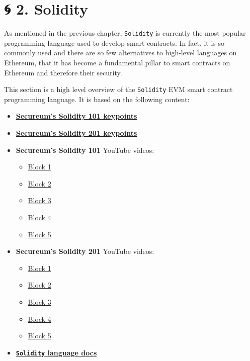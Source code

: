 \chapter{🌀 2. Solidity}\label{solidity}

As mentioned in the previous chapter, \texttt{Solidity} is currently the
most popular programming language used to develop smart contracts. In
fact, it is so commonly used and there are so few alternatives to
high-level languages on Ethereum, that it has become a fundamental
pillar to smart contracts on Ethereum and therefore their security.

This section is a high level overview of the \texttt{Solidity} EVM smart
contract programming language. It is based on the following content:

\begin{itemize}
\tightlist
\item
  \href{https://secureum.substack.com/p/solidity-101}{\textbf{Secureum's
  Solidity 101 keypoints}}
\item
  \href{https://secureum.substack.com/p/solidity-201}{\textbf{Secureum's
  Solidity 201 keypoints}}
\item
  \textbf{Secureum's Solidity 101} YouTube videos:

  \begin{itemize}
  \tightlist
  \item
    \href{https://www.youtube.com/watch?v=5eLqFac5Tkg}{Block 1}
  \item
    \href{https://www.youtube.com/watch?v=TCl1IcGl_3I}{Block 2}
  \item
    \href{https://www.youtube.com/watch?v=6VIJpze1jbU}{Block 3}
  \item
    \href{https://www.youtube.com/watch?v=WgU7KKKomMk}{Block 4}
  \item
    \href{https://www.youtube.com/watch?v=_oN7XuyhoZA}{Block 5}
  \end{itemize}
\item
  \textbf{Secureum's Solidity 201} YouTube videos:

  \begin{itemize}
  \tightlist
  \item
    \href{https://www.youtube.com/watch?v=3bFgsmsQXrE}{Block 1}
  \item
    \href{https://www.youtube.com/watch?v=TqMIbouwePE}{Block 2}
  \item
    \href{https://www.youtube.com/watch?v=C0zBhTgppLQ}{Block 3}
  \item
    \href{https://www.youtube.com/watch?v=L_9Fk6HRwpU}{Block 4}
  \item
    \href{https://www.youtube.com/watch?v=0kx8M4u5980}{Block 5}
  \end{itemize}
\item
  \href{https://docs.soliditylang.org/en/latest/}{\textbf{\texttt{Solidity}
  language docs}}
\end{itemize}
